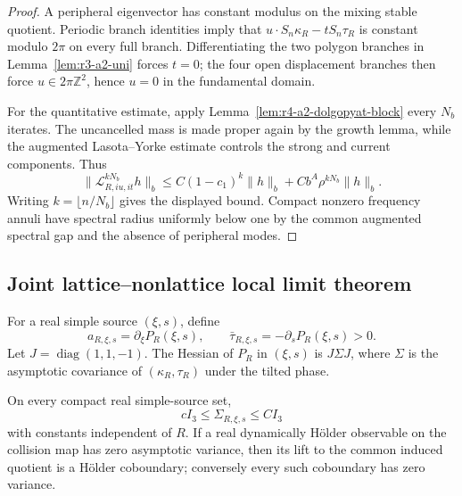 \begin{proof}
A peripheral eigenvector has constant modulus on the mixing stable quotient.
Periodic branch identities imply that
\(u\cdot S_n\kappa_R-tS_n\tau_R\) is constant modulo \(2\pi\) on every full
branch.  Differentiating the two polygon branches in
Lemma~\ref{lem:r3-a2-uni} forces \(t=0\); the four open displacement branches
then force \(u\in2\pi\mathbb Z^2\), hence \(u=0\) in the fundamental domain.

For the quantitative estimate, apply
Lemma~\ref{lem:r4-a2-dolgopyat-block} every \(N_b\) iterates.  The uncancelled
mass is made proper again by the growth lemma, while the augmented
Lasota--Yorke estimate controls the strong and current components.  Thus
\[
 \|\mathcal L_{R,iu,it}^{kN_b}h\|_b
 \le C(1-c_1)^k\|h\|_b+C b^A\rho^{kN_b}\|h\|_b.
\]
Writing \(k=\lfloor n/N_b\rfloor\) gives the displayed bound.  Compact
nonzero frequency annuli have spectral radius uniformly below one by the
common augmented spectral gap and the absence of peripheral modes.
\end{proof}

\subsection{Joint lattice--nonlattice local limit theorem}

For a real simple source \((\xi,s)\), define
\[
 a_{R,\xi,s}=\partial_\xi P_R(\xi,s),
 \qquad
 \bar\tau_{R,\xi,s}=-\partial_sP_R(\xi,s)>0.
\]
Let \(J=\operatorname{diag}(1,1,-1)\).  The Hessian of \(P_R\) in
\((\xi,s)\) is \(J\Sigma J\), where \(\Sigma\) is the asymptotic covariance
of \((\kappa_R,\tau_R)\) under the tilted phase.

\begin{lemma}
\label{lem:r3-a2-cov}
On every compact real simple-source set,
\[
 cI_3\le\Sigma_{R,\xi,s}\le CI_3
\]
with constants independent of \(R\).  If a real dynamically H\"older
observable on the collision map has zero asymptotic variance, then its lift to
the common induced quotient is a H\"older coboundary; conversely every such
coboundary has zero variance.
\end{lemma}

